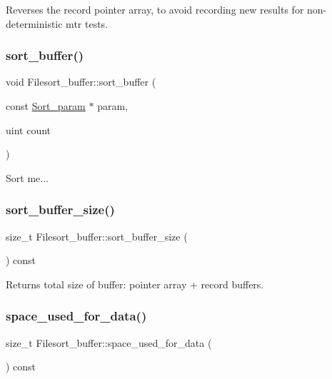 Reverses the record pointer array, to avoid recording new results for non-\/deterministic mtr tests. \mbox{\label{classFilesort__buffer_adb7d7a439a496d0ab703c193dced5e32}} 
\subsubsection{\texorpdfstring{sort\+\_\+buffer()}{sort\_buffer()}}
{\footnotesize\ttfamily void Filesort\+\_\+buffer\+::sort\+\_\+buffer (\begin{DoxyParamCaption}\item[{const \mbox{\hyperlink{classSort__param}{Sort\+\_\+param}} $\ast$}]{param,  }\item[{uint}]{count }\end{DoxyParamCaption})}

Sort me... \mbox{\label{classFilesort__buffer_a65a2f7a974695eab8917c28cf82078f3}} 
\subsubsection{\texorpdfstring{sort\+\_\+buffer\+\_\+size()}{sort\_buffer\_size()}}
{\footnotesize\ttfamily size\+\_\+t Filesort\+\_\+buffer\+::sort\+\_\+buffer\+\_\+size (\begin{DoxyParamCaption}{ }\end{DoxyParamCaption}) const\hspace{0.3cm}{\ttfamily [inline]}}

\begin{DoxyReturn}{Returns}
total size of buffer\+: pointer array + record buffers. 
\end{DoxyReturn}
\mbox{\label{classFilesort__buffer_aa6530a61d921471327a2477d05e3d321}} 
\subsubsection{\texorpdfstring{space\+\_\+used\+\_\+for\+\_\+data()}{space\_used\_for\_data()}}
{\footnotesize\ttfamily size\+\_\+t Filesort\+\_\+buffer\+::space\+\_\+used\+\_\+for\+\_\+data (\begin{DoxyParamCaption}{ }\end{DoxyParamCaption}) const\hspace{0.3cm}{\ttfamily [inline]}}

